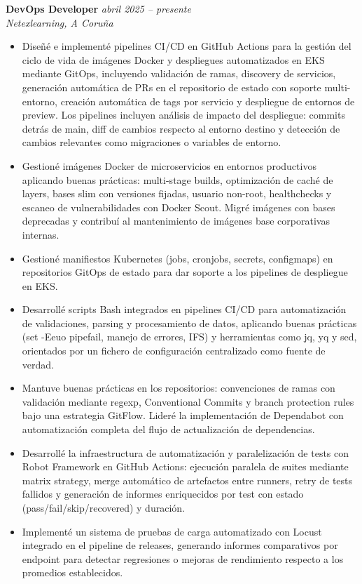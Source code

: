 \documentclass[a4paper,11pt]{article}
\begin{document}
\textbf{DevOps Developer} \hfill \textit{abril 2025 -- presente} \\
\textit{Netexlearning, A Coruña}
\begin{itemize}
  \item Diseñé e implementé pipelines CI/CD en GitHub Actions para la gestión del ciclo de vida de imágenes Docker y despliegues automatizados en EKS mediante GitOps, incluyendo validación de ramas, discovery de servicios, generación automática de PRs en el repositorio de estado con soporte multi-entorno, creación automática de tags por servicio y despliegue de entornos de preview. Los pipelines incluyen análisis de impacto del despliegue: commits detrás de main, diff de cambios respecto al entorno destino y detección de cambios relevantes como migraciones o variables de entorno.
  \item Gestioné imágenes Docker de microservicios en entornos productivos aplicando buenas prácticas: multi-stage builds, optimización de caché de layers, bases slim con versiones fijadas, usuario non-root, healthchecks y escaneo de vulnerabilidades con Docker Scout. Migré imágenes con bases deprecadas y contribuí al mantenimiento de imágenes base corporativas internas.
  \item Gestioné manifiestos Kubernetes (jobs, cronjobs, secrets, configmaps) en repositorios GitOps de estado para dar soporte a los pipelines de despliegue en EKS.
  \item Desarrollé scripts Bash integrados en pipelines CI/CD para automatización de validaciones, parsing y procesamiento de datos, aplicando buenas prácticas (set -Eeuo pipefail, manejo de errores, IFS) y herramientas como jq, yq y sed, orientados por un fichero de configuración centralizado como fuente de verdad.
  \item Mantuve buenas prácticas en los repositorios: convenciones de ramas con validación mediante regexp, Conventional Commits y branch protection rules bajo una estrategia GitFlow. Lideré la implementación de Dependabot con automatización completa del flujo de actualización de dependencias.
  \item Desarrollé la infraestructura de automatización y paralelización de tests con Robot Framework en GitHub Actions: ejecución paralela de suites mediante matrix strategy, merge automático de artefactos entre runners, retry de tests fallidos y generación de informes enriquecidos por test con estado (pass/fail/skip/recovered) y duración.
  \item Implementé un sistema de pruebas de carga automatizado con Locust integrado en el pipeline de releases, generando informes comparativos por endpoint para detectar regresiones o mejoras de rendimiento respecto a los promedios establecidos.

\end{itemize}
\end{document}
